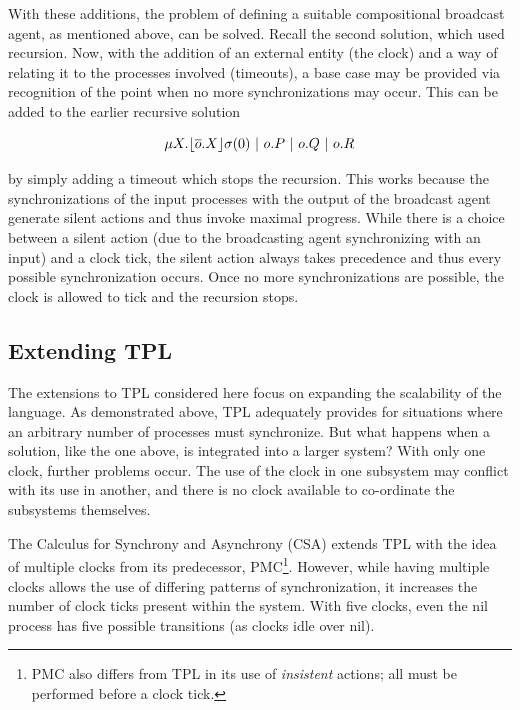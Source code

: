 With these additions, the problem of defining a suitable compositional
broadcast agent, as mentioned above, can be solved.  Recall the second
solution, which used recursion.  Now, with the addition of an external
entity (the clock) and a way of relating it to the processes involved
(timeouts), a base case may be provided via recognition of the point
when no more synchronizations may occur.  This can be added to the
earlier recursive solution

\begin{equation}
\mu X.\timeout{\overline{o}.X}{\sigma}{0}\ |\ o.P\ |\ o.Q\ |\ o.R
\end{equation}

\noindent by simply adding a timeout which stops the recursion.  This
works because the synchronizations of the input processes with the
output of the broadcast agent generate silent actions and thus invoke
maximal progress.  While there is a choice between a silent action
(due to the broadcasting agent synchronizing with an input) and a
clock tick, the silent action always takes precedence and thus every
possible synchronization occurs.  Once no more synchronizations are
possible, the clock is allowed to tick and the recursion stops.

\subsection{Extending TPL}
\label{tplext}

The extensions to TPL considered here focus on expanding the
scalability of the language.  As demonstrated above, TPL adequately
provides for situations where an arbitrary number of processes must
synchronize.  But what happens when a solution, like the one above, is
integrated into a larger system?  With only one clock, further
problems occur.  The use of the clock in one subsystem may conflict
with its use in another, and there is no clock available to
co-ordinate the subsystems themselves.

The Calculus for Synchrony and Asynchrony (CSA) \cite{csa} extends TPL
with the idea of multiple clocks from its predecessor, PMC\footnote{PMC
also differs from TPL in its use of \emph{insistent} actions; all must
be performed before a clock tick.}\cite{pmc}. However, while having
multiple clocks allows the use of differing patterns of synchronization,
it increases the number of clock ticks present within the system.  With
five clocks, even the nil process has five possible transitions (as
clocks idle over nil).

